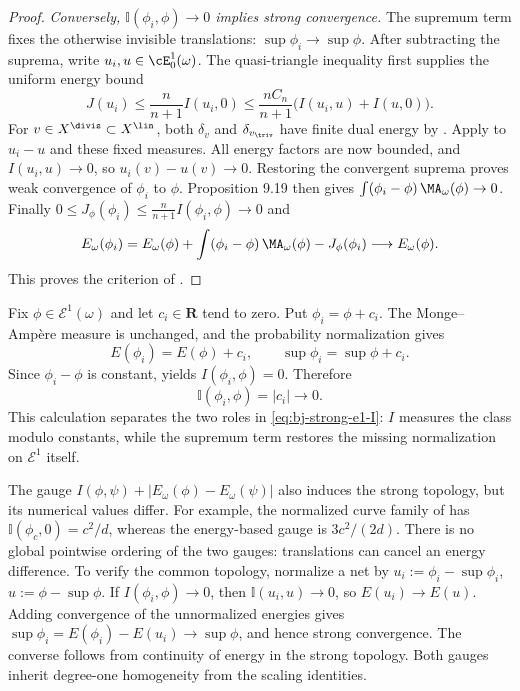 \begin{proof}
\emph{Conversely, $\mathbb I(\phi_i,\phi)\to0$ implies strong
convergence.}  The supremum term fixes the otherwise invisible
translations: $\sup\phi_i\to\sup\phi$.  After subtracting the suprema, write $u_i,u\in\cE^1_0(\omega)$.
The quasi-triangle inequality first supplies the uniform energy bound
\[
 J(u_i)\le\frac n{n+1}I(u_i,0)
 \le\frac{nC_n}{n+1}\bigl(I(u_i,u)+I(u,0)\bigr).
\]
For $v\in X^{\divis}\subset X^{\lin}$, both $\delta_v$ and
$\delta_{v_{\triv}}$ have finite dual energy by
. Apply
\cite[Theorem~10.3]{BJ22} to $u_i-u$ and these fixed measures.
All energy factors are now bounded, and $I(u_i,u)\to0$, so
$u_i(v)-u(v)\to0$. Restoring the convergent suprema proves weak
convergence of $\phi_i$ to $\phi$.
Proposition 9.19 then gives
$\int(\phi_i-\phi)\,\MA_\omega(\phi)\to0$.
Finally $0\le J_\phi(\phi_i)\le\frac n{n+1}I(\phi_i,\phi)\to0$ and
\[
 E_\omega(\phi_i)=E_\omega(\phi)
 +\int(\phi_i-\phi)\,\MA_\omega(\phi)-J_\phi(\phi_i)
 \longrightarrow E_\omega(\phi).
\]
This proves the criterion of \cite[Theorem~12.4]{BJ22}.
\end{proof}

\begin{example}
\label{ex:ch48-sup-term}
Fix $\phi\in\mathcal E^1(\omega)$ and let $c_i\in\mathbf R$ tend to
zero.  Put $\phi_i=\phi+c_i$.  The Monge--Amp\`ere measure is unchanged,
and the probability normalization gives
\[
        E(\phi_i)=E(\phi)+c_i,
        \qquad \sup\phi_i=\sup\phi+c_i.
\]
Since $\phi_i-\phi$ is constant,
 yields
$I(\phi_i,\phi)=0$.  Therefore
\[
             \mathbb I(\phi_i,\phi)=|c_i|\longrightarrow0.
\]
This calculation separates the two roles in
\eqref{eq:bj-strong-e1-I}: $I$ measures the class modulo constants, while
the supremum term restores the missing normalization on
$\mathcal E^1$ itself.

The gauge $I(\phi,\psi)+|E_\omega(\phi)-E_\omega(\psi)|$ also induces
the strong topology, but its numerical values differ. For example,
the normalized curve family of  has
$\mathbb I(\phi_c,0)=c^2/d$, whereas the energy-based gauge is
$3c^2/(2d)$. There is no global pointwise ordering of the two gauges:
translations can cancel an energy difference. To verify the common topology, normalize a net by
$u_i:=\phi_i-\sup\phi_i$, $u:=\phi-\sup\phi$.
If $I(\phi_i,\phi)\to0$, then $\mathbb I(u_i,u)\to0$, so
$E(u_i)\to E(u)$. Adding convergence of the unnormalized energies gives
$\sup\phi_i=E(\phi_i)-E(u_i)\to\sup\phi$, and hence strong convergence.
The converse follows from continuity of energy in the strong topology.
Both gauges inherit degree-one homogeneity from the scaling identities.
\end{example}

